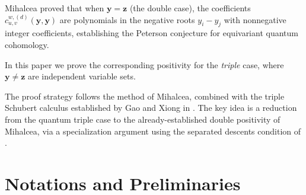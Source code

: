 \documentclass[12pt]{amsart}
\begin{document}
Mihalcea \cite{Mihalcea} proved that when $\mathbf{y}=\mathbf{z}$ (the double case), the coefficients $c_{u,v}^{w,(d)}(\mathbf{y},\mathbf{y})$ are polynomials in the negative roots $y_i-y_j$ with nonnegative integer coefficients, establishing the Peterson conjecture for equivariant quantum cohomology.

In this paper we prove the corresponding positivity for the \emph{triple} case, where $\mathbf{y}\neq\mathbf{z}$ are independent variable sets.

The proof strategy follows the method of Mihalcea, combined with the triple Schubert calculus established by Gao and Xiong in \cite{GX2025}. The key idea is a reduction from the quantum triple case to the already-established double positivity of Mihalcea, via a specialization argument using the separated descents condition of \cite{Sa}.

\section{Notations and Preliminaries}
\label{sec:notations}
\end{document}
